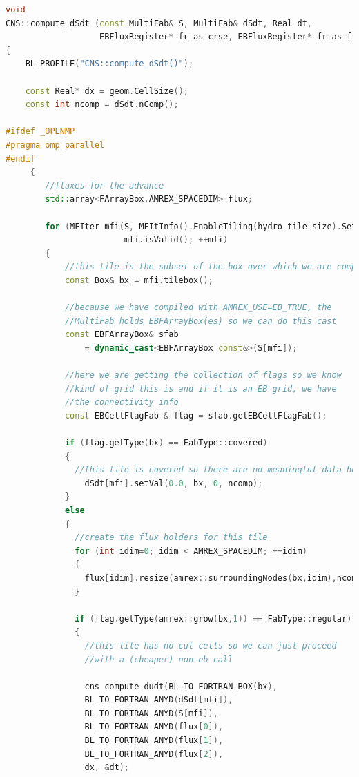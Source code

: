 \begin{lstlisting}[language=cpp]
void
CNS::compute_dSdt (const MultiFab& S, MultiFab& dSdt, Real dt,
                   EBFluxRegister* fr_as_crse, EBFluxRegister* fr_as_fine)
{
    BL_PROFILE("CNS::compute_dSdt()");

    const Real* dx = geom.CellSize();
    const int ncomp = dSdt.nComp();

#ifdef _OPENMP
#pragma omp parallel
#endif
     {
        //fluxes for the advance
        std::array<FArrayBox,AMREX_SPACEDIM> flux;

        for (MFIter mfi(S, MFItInfo().EnableTiling(hydro_tile_size).SetDynamic(true));
                        mfi.isValid(); ++mfi)
        {
            //this tile is the subset of the box over which we are computing
            const Box& bx = mfi.tilebox();

            //because we have compiled with AMREX_USE=EB_TRUE, the
            //MultiFab holds EBFArrayBox(es) so we can do this cast
            const EBFArrayBox& sfab
                = dynamic_cast<EBFArrayBox const&>(S[mfi]);
            
            //here we are getting the collection of flags so we know
            //kind of grid this is and if it is an EB grid, we have
            //the connectivity info
            const EBCellFlagFab & flag = sfab.getEBCellFlagFab();

            if (flag.getType(bx) == FabType::covered) 
            {
              //this tile is covered so there are no meaningful data here
                dSdt[mfi].setVal(0.0, bx, 0, ncomp);
            } 
            else 
            {
              //create the flux holders for this tile
              for (int idim=0; idim < AMREX_SPACEDIM; ++idim) 
              {
                flux[idim].resize(amrex::surroundingNodes(bx,idim),ncomp);
              }

              if (flag.getType(amrex::grow(bx,1)) == FabType::regular)
              {
                //this tile has no cut cells so we can just proceed
                //with a (cheaper) non-eb call

                cns_compute_dudt(BL_TO_FORTRAN_BOX(bx),
                BL_TO_FORTRAN_ANYD(dSdt[mfi]),
                BL_TO_FORTRAN_ANYD(S[mfi]),
                BL_TO_FORTRAN_ANYD(flux[0]),
                BL_TO_FORTRAN_ANYD(flux[1]),
                BL_TO_FORTRAN_ANYD(flux[2]),
                dx, &dt);


\end{lstlisting}
